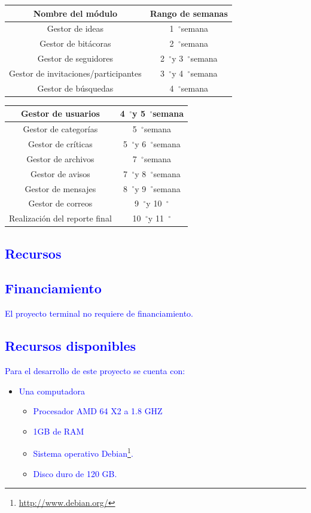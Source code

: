 \documentclass[11pt,letterpaper,titlepage]{article}
\newcommand{\grad}{\hspace{-2mm}$\phantom{a}^{\circ}$}
\begin{document}
\begin{center}
\begin{tabular}{|c|c|}\hline
Nombre del m\'odulo & Rango de semanas\\ \hline\hline
Gestor de ideas&1\grad semana \\ \hline
Gestor de bit\'acoras&2\grad semana \\ \hline
Gestor de seguidores&2\grad y 3\grad semana\\ \hline
Gestor de invitaciones/participantes&3\grad y 4\grad semana \\ \hline
Gestor de b\'usquedas&4\grad semana \\ \hline
\end{tabular}
\end{center}
\begin{center}
\begin{tabular}{|c|c|}\hline
Gestor de usuarios&4\grad y 5\grad semana \\ \hline
Gestor de categor\'ias&5\grad semana \\ \hline
Gestor de cr\'iticas&5\grad y 6\grad semana \\ \hline
Gestor de archivos&7\grad semana\\ \hline
Gestor de avisos&7\grad y 8\grad semana\\ \hline
Gestor de mensajes&8\grad y 9\grad semana\\ \hline
Gestor de correos&9\grad y 10\grad \\ \hline
Realizaci\'on del reporte final&10\grad y 11\grad \\ \hline
\end{tabular}
\end{center}


\textcolor{blue}{
\section{Recursos}
\subsection{Financiamiento}
El proyecto terminal no requiere de financiamiento.
\subsection{Recursos disponibles}
Para el desarrollo de este proyecto se cuenta con:}
\begin{itemize}
 \item \textcolor{blue}{Una computadora}
  \begin{itemize}
   \item \textcolor{blue}{Procesador AMD 64 X2  a 1.8 GHZ }
   \item \textcolor{blue}{1GB de RAM}
   \item \textcolor{blue}{Sistema operativo Debian\footnote{\href{http://www.debian.org/}{http://www.debian.org/}}.}
   \item \textcolor{blue}{Disco duro de 120 GB.}
  \end{itemize}

\end{itemize}
\end{document}
